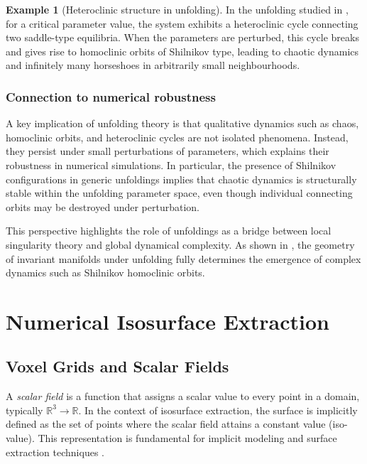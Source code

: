 \documentclass[12pt, a4paper, oneside]{book}
\theoremstyle{plain}
\theoremstyle{definition}
\newtheorem{example}[theorem]{Example}
\theoremstyle{remark}
\theoremstyle{definition}
\begin{document}
\begin{example}[Heteroclinic structure in unfolding]
In the unfolding studied in \cite{ibanez2005shil}, for a critical parameter value, the
system exhibits a heteroclinic cycle connecting two saddle-type equilibria. When the
parameters are perturbed, this cycle breaks and gives rise to homoclinic orbits of
Shilnikov type, leading to chaotic dynamics and infinitely many horseshoes in arbitrarily
small neighbourhoods.
\end{example}

\subsection{Connection to numerical robustness}

A key implication of unfolding theory is that qualitative dynamics such as chaos,
homoclinic orbits, and heteroclinic cycles are not isolated phenomena. Instead, they
persist under small perturbations of parameters, which explains their robustness in
numerical simulations. In particular, the presence of Shilnikov configurations in generic
unfoldings implies that chaotic dynamics is structurally stable within the unfolding
parameter space, even though individual connecting orbits may be destroyed under
perturbation.

This perspective highlights the role of unfoldings as a bridge between local singularity
theory and global dynamical complexity. As shown in \cite{ibanez2005shil}, the geometry
of invariant manifolds under unfolding fully determines the emergence of complex dynamics
such as Shilnikov homoclinic orbits.

\chapter{Numerical Isosurface Extraction}
\section{Voxel Grids and Scalar Fields}

A \emph{scalar field} is a function that assigns a scalar value to every point in a
domain, typically $\mathbb{R}^3 \rightarrow \mathbb{R}$. In the context of isosurface
extraction, the surface is implicitly defined as the set of points where the scalar field
attains a constant value (iso-value). This representation is fundamental for implicit
modeling and surface extraction techniques \cite{bloomenthal1997introduction}.
\end{document}
